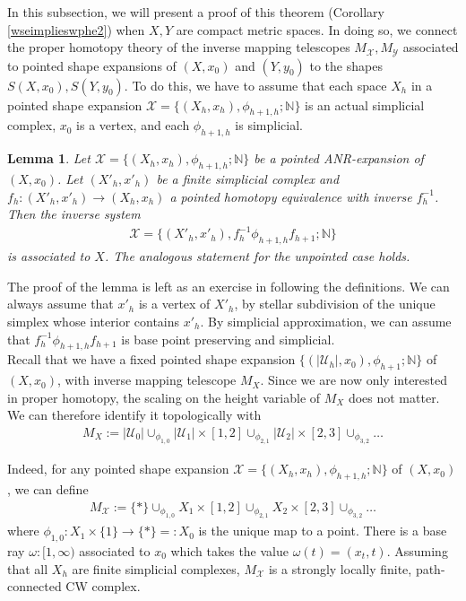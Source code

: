 \documentclass[a4paper,11pt]{article}
\theoremstyle{definition}
\theoremstyle{plain}
\newtheorem{lemma}[definition]{Lemma}
\theoremstyle{remark}
\begin{document}
{In this subsection, we will present a proof of this theorem (Corollary \ref{wseimplieswphe2}) when $X,Y$ are compact metric spaces. In doing so, we connect the proper homotopy theory of the inverse mapping telescopes $M_{\mathcal{X}}, M_{\mathcal{Y}}$ associated to pointed shape expansions of $(X,x_0)$ and $(Y,y_{0})$ to the shapes $S(X,x_0),S(Y,y_0)$. To do this, we have to assume that each space $X_{h}$ in a pointed shape expansion $\mathcal{X}=\{(X_{h},x_{h}),\phi_{h+1,h};\mathbb{N}\}$ is an actual simplicial complex, $x_0$ is a vertex, and each $\phi_{h+1,h}$ is simplicial. \\

\begin{lemma} Let $\mathcal{X}=\{(X_{h},x_{h}),\phi_{h+1,h};\mathbb{N}\}$ be a pointed ANR-expansion of $(X,x_{0})$. Let $(X'_{h},x'_{h})$ be a finite simplicial complex and $f_{h}: (X'_{h},x'_{h})\rightarrow (X_{h},x_{h})$ a pointed homotopy equivalence with inverse $f_{h}^{-1}$. Then the inverse system
\begin{align*}
\mathcal{X}=\{(X'_{h},x'_{h}), f_{h}^{-1}\phi_{h+1,h}f_{h+1};\mathbb{N}\}
\end{align*}
is associated to $X$. The analogous statement for the unpointed case holds. 
\end{lemma}

The proof of the lemma is left as an exercise in following the definitions. We can always assume that $x'_{h}$ is a vertex of $X'_{h}$, by stellar subdivision of the unique simplex whose interior contains $x'_{h}$. By simplicial approximation, we can assume that $f_{h}^{-1}\phi_{h+1,h}f_{h+1}$ is base point preserving and simplicial. \\

Recall that we have a fixed pointed shape expansion $\{(|\mathcal{U}_{h}|,x_0),\phi_{h+1};\mathbb{N}\}$ of $(X,x_0)$, with inverse mapping telescope $M_{X}$. Since we are now only interested in proper homotopy, the scaling on the height variable of $M_{X}$ does not matter. We can therefore identify it topologically with 
\begin{align*}
M_{X}:= |\mathcal{U}_{0}| \cup_{{\phi}_{1,0}} |\mathcal{U}_{1}| \times [1,2] \cup_{{\phi}_{2,1}} |\mathcal{U}_{2}| \times [2,3] \cup_{{\phi}_{3,2}} \dots
\end{align*}

Indeed, for any pointed shape expansion $\mathcal{X}=\{(X_{h},x_{h}),\phi_{h+1,h};\mathbb{N}\}$ of $(X,x_0)$, we can define 
\begin{align*}
M_{\mathcal{X}}:= \{\ast\} \cup_{\phi_{1,0}} X_{1} \times [1,2] \cup_{\phi_{2,1}} X_{2} \times [2,3] \cup_{\phi_{3,2}} \dots 
\end{align*}
where $\phi_{1,0}: X_{1} \times \{1\} \rightarrow \{\ast\}=:X_{0}$ is the unique map to a point. There is a base ray $\omega: [1,\infty)$ associated to $x_0$ which takes the value $\omega(t) = (x_{t},t)$. Assuming that all $X_{h}$ are finite simplicial complexes, $M_{\mathcal{X}}$ is a strongly locally finite, path-connected CW complex.\\

}
\end{document}

